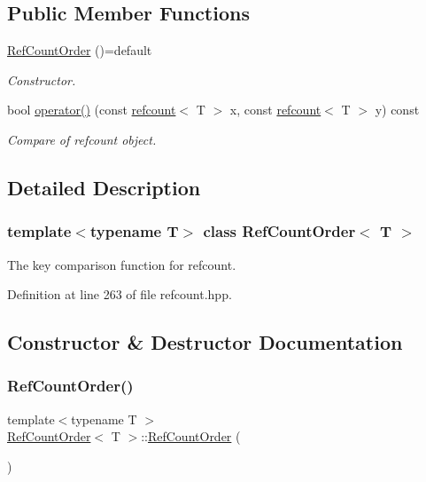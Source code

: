 \subsection*{Public Member Functions}
\begin{DoxyCompactItemize}
\item 
\hyperlink{classRefCountOrder_a630754430932fdfc7ed0a66639860575}{Ref\+Count\+Order} ()=default
\begin{DoxyCompactList}\small\item\em Constructor. \end{DoxyCompactList}\item 
bool \hyperlink{classRefCountOrder_ac1c51bb2fa7ad707aafbbd5dfb2fc6f7}{operator()} (const \hyperlink{structrefcount}{refcount}$<$ T $>$ x, const \hyperlink{structrefcount}{refcount}$<$ T $>$ y) const
\begin{DoxyCompactList}\small\item\em Compare of refcount object. \end{DoxyCompactList}\end{DoxyCompactItemize}


\subsection{Detailed Description}
\subsubsection*{template$<$typename T$>$\newline
class Ref\+Count\+Order$<$ T $>$}

The key comparison function for refcount. 

Definition at line 263 of file refcount.\+hpp.



\subsection{Constructor \& Destructor Documentation}
\mbox{\label{classRefCountOrder_a630754430932fdfc7ed0a66639860575}} 
\subsubsection{\texorpdfstring{Ref\+Count\+Order()}{RefCountOrder()}}
{\footnotesize\ttfamily template$<$typename T $>$ \\
\hyperlink{classRefCountOrder}{Ref\+Count\+Order}$<$ T $>$\+::\hyperlink{classRefCountOrder}{Ref\+Count\+Order} (\begin{DoxyParamCaption}{ }\end{DoxyParamCaption})\hspace{0.3cm}{\ttfamily [default]}}




